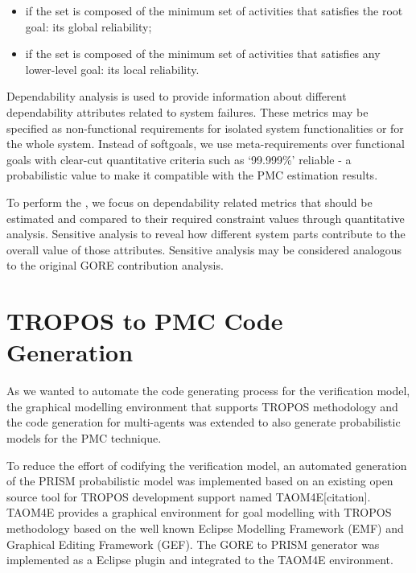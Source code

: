 \begin{itemize}

\item if the set is composed of the minimum set of activities that satisfies the root goal: its global reliability;  

\item if the set is composed of the minimum set of activities that satisfies any lower-level goal: its local reliability.

\end{itemize}

Dependability analysis is used to provide information about different dependability attributes related to system failures. These metrics may be specified as non-functional requirements for isolated system functionalities or for the whole system. Instead of softgoals, we use meta-requirements over functional goals with clear-cut quantitative criteria such as `99.999\%' reliable - a probabilistic value to make it compatible with the PMC estimation results.

To perform the , we focus on dependability related metrics that should be estimated and compared to their required constraint values through quantitative analysis. Sensitive analysis to reveal how different system parts contribute to the overall value of those attributes. Sensitive analysis may be considered analogous to the original GORE contribution analysis.



\section{TROPOS to PMC Code Generation}

As we wanted to automate the code generating process for the verification model, the graphical modelling environment that supports TROPOS methodology and the code generation for multi-agents was extended to also generate probabilistic models for the PMC technique.

To reduce the effort of codifying the verification model, an automated generation of the PRISM probabilistic model was implemented based on an existing open source tool for TROPOS development support named TAOM4E[citation]. TAOM4E provides a graphical environment for goal modelling with TROPOS methodology based on the well known Eclipse Modelling Framework (EMF) and Graphical Editing Framework (GEF). The GORE to PRISM generator was implemented as a Eclipse plugin and integrated to the TAOM4E environment. 

